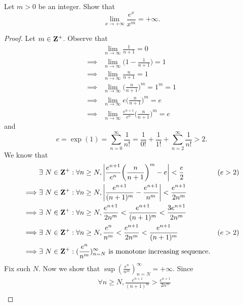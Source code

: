 \begin{exercise}\label{ex 4.5.8}
  Let \(m > 0\) be an integer.
  Show that
  \[
    \lim_{x \to +\infty} \frac{e^x}{x^m} = +\infty.
  \]
\end{exercise}

\begin{proof}
  Let \(m \in \mathbf{Z}^+\).
  Observe that
  \begin{align*}
             & \lim_{n \to \infty} \frac{1}{n + 1} = 0                                     \\
    \implies & \lim_{n \to \infty} \bigg(1 - \frac{1}{n + 1}\bigg) = 1                     \\
    \implies & \lim_{n \to \infty} \frac{n}{n + 1} = 1                                     \\
    \implies & \lim_{n \to \infty} \bigg(\frac{n}{n + 1}\bigg)^m = 1^m = 1                 \\
    \implies & \lim_{n \to \infty} e \bigg(\frac{n}{n + 1}\bigg)^m = e                     \\
    \implies & \lim_{n \to \infty} \frac{e^{n + 1}}{e^n} \bigg(\frac{n}{n + 1}\bigg)^m = e
  \end{align*}
  and
  \[
    e = \exp(1) = \sum_{n = 0}^\infty \frac{1}{n!} = \frac{1}{0!} + \frac{1}{1!} + \sum_{n = 2}^\infty \frac{1}{n!} > 2.
  \]
  We know that
  \begin{align*}
             & \exists\ N \in \mathbf{Z}^+ : \forall n \geq N, \left\lvert\frac{e^{n + 1}}{e^n} \bigg(\frac{n}{n + 1}\bigg)^m - e\right\rvert < \frac{e}{2}         & (e > 2) \\
    \implies & \exists\ N \in \mathbf{Z}^+ : \forall n \geq N, \left\lvert\frac{e^{n + 1}}{(n + 1)^m} - \frac{e^{n + 1}}{n^m}\right\rvert < \frac{e^{n + 1}}{2 n^m}           \\
    \implies & \exists\ N \in \mathbf{Z}^+ : \forall n \geq N, \frac{e^{n + 1}}{2 n^m} < \frac{e^{n + 1}}{(n + 1)^m} < \frac{3 e^{n + 1}}{2 n^m}             \\
    \implies & \exists\ N \in \mathbf{Z}^+ : \forall n \geq N, \frac{e^n}{n^m} < \frac{e^{n + 1}}{2 n^m} < \frac{e^{n + 1}}{(n + 1)^m}             & (e > 2) \\
    \implies & \exists\ N \in \mathbf{Z}^+ : (\frac{e^n}{n^m})_{n = N}^\infty \text{ is monotone increasing sequence}.
  \end{align*}
  Fix such \(N\).
  Now we show that \(\sup(\frac{e^n}{n^m})_{n = N}^\infty = +\infty\).
  Since
  \begin{align*}
             & \forall n \geq N, \frac{e^{n + 1}}{(n + 1)^m} > \frac{e^{n + 1}}{2 n^m}                                                                           \\

\end{align*}
\end{proof}
